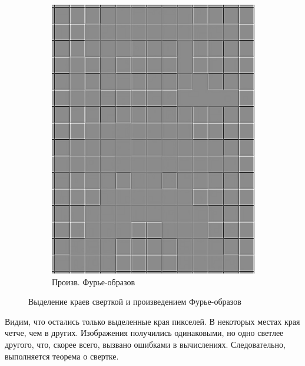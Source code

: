 \documentclass[a4paper, 12pt]{article}
\begin{document}
\begin{figure}[H]
\begin{subfigure}{0.35\textwidth}
            \includegraphics[width=\linewidth]{edgen_fft2.png}
            \caption{Произв. Фурье-образов}
            \label{fig:padotpnggraynew}
        \end{subfigure}
        \caption{Выделение краев сверткой и произведением Фурье-образов}
        \label{fig:task4new}
    \end{figure}


    Видим, что остались только выделенные края пикселей. В некоторых местах края четче, чем в других. Изображения получились одинаковыми, но одно светлее другого, что, скорее всего,
    вызвано ошибками в вычислениях. Следовательно, выполняется теорема о свертке.
\end{document}
